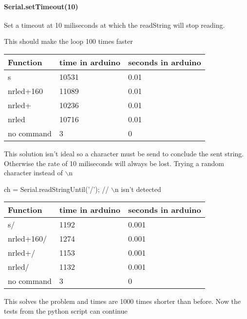 \documentclass{scrartcl}
\begin{document}
\paragraph{Serial.setTimeout(10)}

Set a timeout at 10 miliseconds at which the readString will stop reading. 

This should make the loop 100 times faster



\begin{tabular}{ |l|l|l| }
\hline
 Function & time in arduino & seconds in arduino \tabularnewline
\hline
\hline
 s & 10531 & 0.01 \tabularnewline
\hline
 nrled+160 & 11089 & 0.01 \tabularnewline
\hline
 nrled+ & 10236 & 0.01 \tabularnewline
\hline
 nrled & 10716 & 0.01 \tabularnewline
\hline
 no command & 3 & 0 \tabularnewline
\hline
\end{tabular}






This solution isn't ideal so a character must be send to conclude the sent string. Otherwise the rate of 10 miliseconds will always be lost. Trying a random character instead of $\backslash$n

ch = Serial.readStringUntil('/');  // $\backslash$n isn't detected



\begin{tabular}{ |l|l|l| }
\hline
 Function & time in arduino & seconds in arduino \tabularnewline
\hline
\hline
 s/ & 1192 & 0.001 \tabularnewline
\hline
 nrled+160/ & 1274 & 0.001 \tabularnewline
\hline
 nrled+/ & 1153 & 0.001 \tabularnewline
\hline
 nrled/ & 1132 & 0.001 \tabularnewline
\hline
 no command & 3 & 0 \tabularnewline
\hline
\end{tabular}




This solves the problem and times are 1000 times shorter than before. Now the tests from the python script can continue
\end{document}
